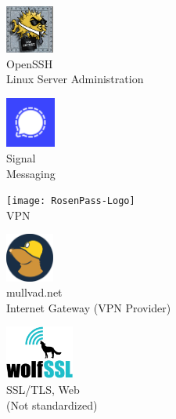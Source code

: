 \begin{frame}[T]{}

\centering

\vspace{0.5em}
\begin{minipage}{.25\textwidth}
  \centering
  \includegraphics[width=4.3em]{graphics/logos/OpenSSH_logo.png}
  \\ OpenSSH
  \\ Linux Server Administration
\end{minipage}
\hspace{.31\textwidth}
\begin{minipage}{.25\textwidth}
  \centering
  \vspace{0.1em}
  \includegraphics[width=4.45em]{graphics/logos/Signal-Logo-White_on_Ultramarine_(2024).svg}
  \\ Signal
  \\ Messaging
\end{minipage}

\vspace{-0.6em}
\begin{minipage}{.25\textwidth}
  \centering
  \texttt{[image: RosenPass-Logo]}
  \\ VPN
\end{minipage}
\vspace{-3.2em}

\begin{minipage}{.25\textwidth}
  \centering
  \includegraphics[width=4.3em]{graphics/logos/mullvad.svg}
  \\ mullvad.net
  \\ Internet Gateway (VPN Provider)
\end{minipage}
\hspace{.31\textwidth}
\begin{minipage}{.25\textwidth}
  \centering
  \vspace{-1em}
  \includegraphics[width=6.1em]{graphics/logos/wolfssl_logo_300px.png}
  \\ SSL/TLS, Web
  \\ (Not standardized)
\end{minipage}

\end{frame}
